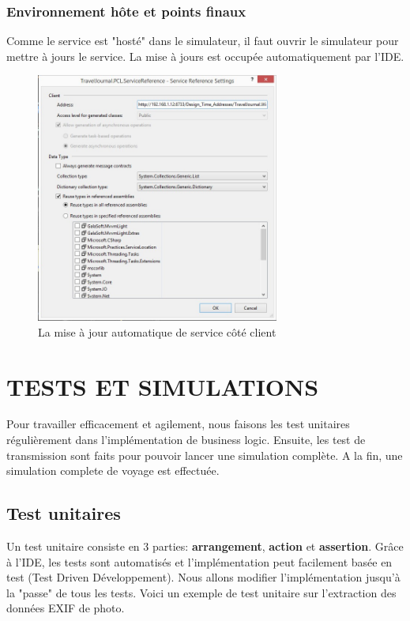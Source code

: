 \documentclass{article}
\begin{document}
\subsubsection{\large Environnement hôte et points finaux}
Comme le service est "hosté" dans le simulateur, il faut ouvrir le simulateur pour mettre à jours le service.  La mise à jours est occupée automatiquement par l'IDE. 
\begin{figure}[h!]
\centering
\includegraphics[width=80mm]{UPSERVICE.jpg}
\caption{La mise à jour automatique de service côté client}
\end{figure}

\vspace{2cm}
\section{\LARGE TESTS ET SIMULATIONS }
Pour travailler efficacement et agilement, nous faisons les test unitaires régulièrement dans l'implémentation de business logic. Ensuite, les test de transmission sont faits pour pouvoir lancer une simulation complète. A la fin, une simulation complete de voyage est effectuée. 

\vspace{0.2 cm}
\subsection{\Large Test unitaires}

Un test unitaire consiste en 3 parties: \textbf{arrangement}, \textbf{action} et \textbf{assertion}. Grâce à l'IDE, les tests sont automatisés et l'implémentation peut facilement basée en test (Test Driven Développement). Nous allons modifier l'implémentation jusqu'à la "passe" de tous les tests. Voici un exemple de test unitaire sur l'extraction des données EXIF de photo. 
\end{document}
